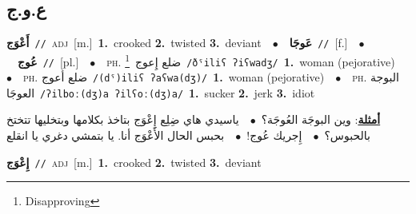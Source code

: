 \documentclass[10pt,a4paper,twoside]{article} %
\begin{document}
\begin{multicols}{2}
\vspace{-3mm}
\subsection*{\color{blue}\foreignlanguage{arabic}{ع.و.ج}\color{blue}{}} 

{\setlength\topsep{0pt}\textbf{\foreignlanguage{arabic}{أَعْوَج}}\ {\color{gray}\texttt{//}\color{black}}\ \textsc{adj}\ [m.]\ \textbf{1.}~crooked  \textbf{2.}~twisted  \textbf{3.}~deviant\ \ $\bullet$\ \ \setlength\topsep{0pt}\textbf{\foreignlanguage{arabic}{عَوجَا}}\ {\color{gray}\texttt{//}\color{black}}\ [f.]\ \ $\bullet$\ \ \setlength\topsep{0pt}\textbf{\foreignlanguage{arabic}{عُوج}}\ {\color{gray}\texttt{//}\color{black}}\ [pl.]\ \ $\bullet$\ \ \textsc{ph.} \color{gray} \foreignlanguage{arabic}{ضلع إِعوج}\color{black}\ \footnote{Disapproving}\ {\color{gray}\texttt{/{\sffamily ðˤiliʕ ʔiʕwadʒ}/}\color{black}}\ \textbf{1.}~woman (pejorative)\ \ $\bullet$\ \ \textsc{ph.} \color{gray} \foreignlanguage{arabic}{ضلع أعوج}\color{black}\ {\color{gray}\texttt{/{\sffamily (dˤ)iliʕ ʔaʕwa(dʒ)}/}\color{black}}\ \textbf{1.}~woman (pejorative)\ \ $\bullet$\ \ \textsc{ph.} \color{gray} \foreignlanguage{arabic}{البوجة العوجَا}\color{black}\ {\color{gray}\texttt{/{\sffamily ʔilboː(dʒ)a ʔilʕoː(dʒ)a}/}\color{black}}\ \textbf{1.}~sucker  \textbf{2.}~jerk  \textbf{3.}~idiot\  \begin{flushright}\color{gray}\foreignlanguage{arabic}{\textbf{\underline{\foreignlanguage{arabic}{أمثلة}}}: وين البوجَة العُوجَة؟\ $\bullet$\ \  ياسيدي هاي ضِلِع إِعْوَج بتاخذ بكلامها وبتخليها تتختخ بالحبوس؟\ $\bullet$\ \  إِجريك عُوج!\ $\bullet$\ \  بحبس الحال الأَعْوَج أنا. يا بتمشي دغري يا انقلع}\end{flushright}\color{black}} \vspace{2mm}

{\setlength\topsep{0pt}\textbf{\foreignlanguage{arabic}{إِعْوَج}}\ {\color{gray}\texttt{//}\color{black}}\ \textsc{adj}\ [m.]\ \textbf{1.}~crooked  \textbf{2.}~twisted  \textbf{3.}~deviant\ } \vspace{2mm}


\end{multicols}
\end{document}
